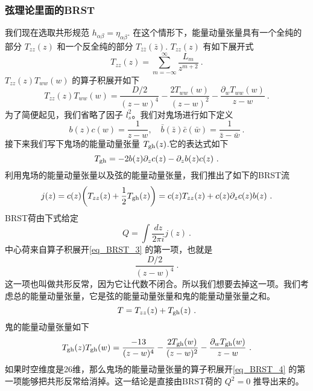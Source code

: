 \subsubsection{弦理论里面的BRST}
我们现在选取共形规范 $h_{\alpha\beta} = \eta_{\alpha\beta}$. 在这个情形下，能量动量张量具有一个全纯的部分 $T_{zz}(z)$ 和一个反全纯的部分 $T_{\bar z\bar z}(\bar z)$. $T_{zz}(z)$ 有如下展开式
\begin{equation}
T_{zz}(z) = \sum_{m=-\infty}^{\infty} \frac{L_{m}}{z^{m+2}}~.
\end{equation}
$T_{zz}(z)T_{ww}(w)$ 的算子积展开如下
\begin{equation}\label{eq_BRST_3}
T_{zz}(z)T_{ww}(w) = \frac{D/2}{(z-w)^4} - \frac{2T_{ww}(w)}{(z-w)^2} - \frac{\partial_wT_{ww}(w)}{z-w}~.
\end{equation}
为了简便起见，我们省略了因子 $l_s^2$。我们对鬼场进行如下定义
\begin{equation}
b(z)c(w) = \frac{1}{z-w},\quad \bar b (\bar z) \bar c (\bar w) = \frac{1}{\bar z- \bar w} ~.
\end{equation} 
接下来我们写下鬼场的能量动量张量 $T_{\rm gh}(z)$.它的表达式如下
\begin{equation}
T_{\rm gh} = -2 b(z) \partial_z c(z) - \partial_z b(z) c(z)~.
\end{equation}
利用鬼场的能量动量张量以及弦的能量动量张量，我们推出了如下的BRST流
\begin{equation}
j(z) = c(z) \bigg( T_{zz} (z) + \frac{1}{2} T_{\rm gh}(z) \bigg) = c(z) T_{zz} (z) + c(z) \partial_z c(z) b(z)~.
\end{equation}
BRST荷由下式给定
\begin{equation}
Q = \int \frac{dz}{2\pi i} j(z)~.
\end{equation}
中心荷来自算子积展开\autoref{eq_BRST_3} 的第一项，也就是
\begin{equation}
\frac{D/2}{(z-w)^4}~.
\end{equation}
这一项也叫做共形反常，因为它让代数不闭合。所以我们想要去掉这一项。我们考虑总的能量动量张量，它是弦的能量动量张量和鬼的能量动量张量之和。
\begin{equation}
T = T_{zz} (z) + T_{\rm gh} (z)~.
\end{equation}
鬼的能量动量张量如下
\begin{equation}\label{eq_BRST_4}
T_{\rm gh}(z) T_{\rm gh} (w) = \frac{-13}{(z-w)^4} - \frac{2T_{\rm gh} (w) }{(z-w)^2} - \frac{\partial_w T_{\rm gh}(w)}{z-w}~.
\end{equation}
如果时空维度是26维，那么鬼场的能量动量张量的算子积展开\autoref{eq_BRST_4} 的第一项能够把共形反常给消掉。这一结论是直接由BRST荷的 $Q^2=0$ 推导出来的。

